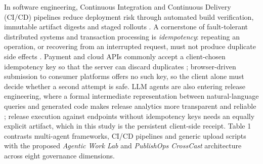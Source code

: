 \documentclass[11pt,a4paper]{article}
\theoremstyle{definition}
\begin{document}
In software engineering, Continuous Integration and Continuous Delivery (CI/CD) pipelines reduce deployment risk through automated build verification, immutable artifact digests and staged rollouts \citep{Humble2010, Bass2015, Adams2016, Shahin2017, Leite2019}. A cornerstone of fault-tolerant distributed systems and transaction processing is \emph{idempotency}: repeating an operation, or recovering from an interrupted request, must not produce duplicate side effects \citep{Schneider1990, gray1992transaction, Kleppmann2017}. Payment and cloud APIs commonly accept a client-chosen idempotency key so that the server can discard duplicates \citep{Helland2012}; browser-driven submission to consumer platforms offers no such key, so the client alone must decide whether a second attempt is safe. LLM agents are also entering release engineering, where a formal intermediate representation between natural-language queries and generated code makes release analytics more transparent and reliable \citep{Khoee2026}; release execution against endpoints without idempotency keys needs an equally explicit artifact, which in this study is the persistent client-side receipt. Table 1 contrasts multi-agent frameworks, CI/CD pipelines and generic upload scripts with the proposed \emph{Agentic Work Lab} and \emph{PublishOps CrossCast} architecture across eight governance dimensions.
\end{document}
